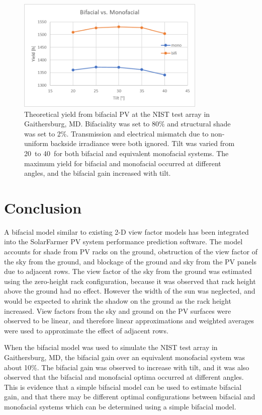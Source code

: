 \documentclass[conference]{IEEEtran}
\begin{document}
\begin{figure}
\centering
\includegraphics[width=9cm]{NIST_bifi-v-mono.png}
\caption{Theoretical yield from bifacial PV at the NIST test array in Gaithersburg, MD.  Bifaciality was set to 80\% and structural shade was set to 2\%.  Transmission and electrical mismatch due to non-uniform backside irradiance were both ignored.  Tilt was varied from 20\degree\ to 40\degree\ for both bifacial and equivalent monofacial systems.  The maximum yield for bifacial and monofacial occurred at different angles, and the bifacial gain increased with tilt.}
\label{fig:NIST-bifi-v-mono}
\end{figure}




\section{Conclusion}
A bifacial model similar to existing 2-D view factor models has been integrated into the SolarFarmer PV system performance prediction software.  The model accounts for shade from PV racks on the ground, obstruction of the view factor of the sky from the ground, and blockage of the ground and sky from the PV panels due to adjacent rows.  The view factor of the sky from the ground was estimated using the zero-height rack configuration, because it was observed that rack height above the ground had no effect.  However the width of the sun was neglected, and would be expected to shrink the shadow on the ground as the rack height increased.  View factors from the sky and ground on the PV surfaces were observed to be linear, and therefore linear approximations and weighted averages were used to approximate the effect of adjacent rows.

When the bifacial model was used to simulate the NIST test array in Gaithersburg, MD, the bifacial gain over an equivalent monofacial system was about 10\%.  The bifacial gain was observed to increase with tilt, and it was also observed that the bifacial and monofacial optima occurred at different angles.  This is evidence that a simple bifacial model can be used to estimate bifacial gain, and that there may be different optimal configurations between bifacial and monofacial systems which can be determined using a simple bifacial model.
\end{document}
